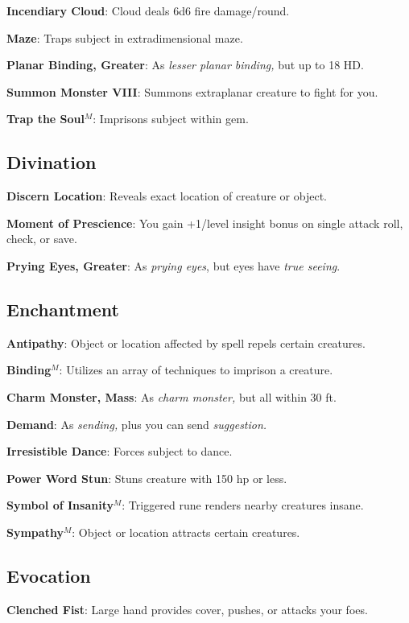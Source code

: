 \textbf{Incendiary Cloud}: Cloud deals 6d6 fire damage/round.

\textbf{Maze}: Traps subject in extradimensional maze.

\textbf{Planar Binding, Greater}: As \textit{lesser planar binding, }but up to 18 HD.

\textbf{Summon Monster VIII}: Summons extraplanar creature to fight for you.

\textbf{Trap the Soul}\(^{M}\): Imprisons subject within gem.

\subsection{Divination}


\textbf{Discern Location}: Reveals exact location of creature or object.

\textbf{Moment of Prescience}: You gain +1/level insight bonus on single attack roll, check, or save.

\textbf{Prying Eyes, Greater}: As \textit{prying eyes}, but eyes have \textit{true seeing}.

\subsection{Enchantment}


\textbf{Antipathy}: Object or location affected by spell repels certain creatures.

\textbf{Binding}\(^{M}\): Utilizes an array of techniques to imprison a creature.

\textbf{Charm Monster, Mass}: As \textit{charm monster, }but all within 30 ft.

\textbf{Demand}: As \textit{sending, }plus you can send \textit{suggestion.}

\textbf{Irresistible Dance}: Forces subject to dance.

\textbf{Power Word Stun}: Stuns creature with 150 hp or less.

\textbf{Symbol of Insanity}\(^{M}\): Triggered rune renders nearby creatures insane.

\textbf{Sympathy}\(^{M}\): Object or location attracts certain creatures.

\subsection{Evocation}


\textbf{Clenched Fist}: Large hand provides cover, pushes, or attacks your foes.


